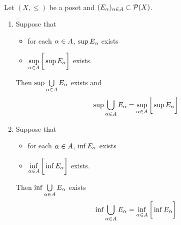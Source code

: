 \documentclass{book}
\begin{document}
	\begin{ex}   \\
		Let $(X, \leq)$ be a poset and $(E_{\alpha})_{\alpha \in A} \subset \mathcal{P}(X)$. 
		\begin{enumerate}
			\item Suppose that 
			\begin{itemize}
				\item for each $\alpha \in A$, $\sup E_{\alpha}$ exists
				\item $\sup\limits_{\alpha \in A} \bigg[ \sup E_{\alpha} \bigg]$ exists.
			\end{itemize}
			Then $\sup \bigcup\limits_{\alpha \in A} E_{\alpha}$ exists and
			$$\sup \bigcup\limits_{\alpha \in A} E_{\alpha} = \sup\limits_{\alpha \in A} \bigg[ \sup E_{\alpha} \bigg]$$
			\item Suppose that 
			\begin{itemize}
				\item for each $\alpha \in A$, $\inf E_{\alpha}$ exists
				\item $\inf\limits_{\alpha \in A} \bigg[ \inf E_{\alpha} \bigg]$ exists.
			\end{itemize}
			Then $\inf \bigcup\limits_{\alpha \in A} E_{\alpha}$ exists
			$$\inf \bigcup\limits_{\alpha \in A} E_{\alpha} = \inf\limits_{\alpha \in A} \bigg[ \inf E_{\alpha} \bigg]$$
		\end{enumerate}
	\end{ex}
	
\end{document}
